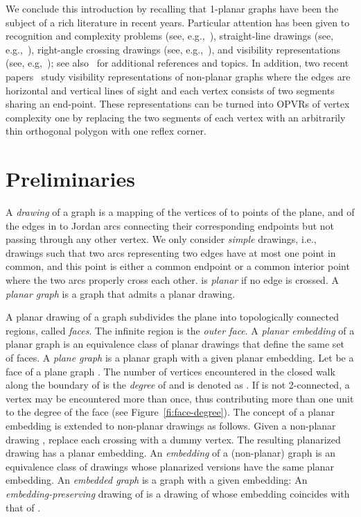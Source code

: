 \documentclass{article}
\newcommand{\opvr}{OPVR\xspace}
\begin{document}
We conclude this introduction by recalling that 1-planar graphs have been the subject of a rich literature in recent years. Particular attention has been given to   recognition and complexity problems (see, e.g.,~\cite{DBLP:conf/wads/BannisterCE13,DBLP:journals/siamcomp/CabelloM13,DBLP:journals/tcs/EadesHKLSS13,DBLP:journals/jgt/KorzhikM13}), straight-line drawings (see, e.g.,~\cite{DBLP:conf/gd/AlamBK13,t-rdg-JGT88}), right-angle crossing drawings (see, e.g.,~\cite{DBLP:conf/gd/DidimoL0M16,DBLP:journals/dam/EadesL13}), and visibility representations (see, e.g,~\cite{SoCG,DBLP:journals/jgaa/Brandenburg14,DBLP:journals/jgaa/Evans0LMW14}); see also~\cite{DBLP:journals/corr/KobourovLM17} for additional references and topics. In addition, two recent papers~\cite{DBLP:journals/tcs/EvansLM16,DBLP:journals/ipl/LiottaM16} study visibility representations of non-planar graphs where the edges are horizontal and vertical lines of sight and each vertex consists of two segments sharing an end-point. These representations can be turned into {\opvr}s of vertex complexity one by replacing the two segments of each vertex with an arbitrarily thin orthogonal polygon with one reflex corner. 



\section{Preliminaries}\label{se:preliminaries}

A \emph{drawing}  of a graph  is a mapping of the vertices of  to points of the plane, and of the edges in  to Jordan arcs connecting their corresponding endpoints but not passing through any other vertex. We only consider \emph{simple} drawings, i.e., drawings such that two arcs representing two edges have at most one point in common, and this point is either a common endpoint or a common interior point where the two arcs properly cross each other.  is \emph{planar} if no edge is crossed. A \emph{planar graph} is a graph that admits a planar drawing.

A planar drawing of a graph subdivides the plane into topologically connected regions, called \emph{faces}. The infinite region is the \emph{outer face}. A \emph{planar embedding} of a planar graph is an equivalence class of planar drawings that define the same set of faces. A \emph{plane graph} is a planar graph with a given planar embedding. Let  be a face of a plane graph . The number of vertices encountered in the closed walk along the boundary of  is the \emph{degree} of  and is denoted as . If  is not 2-connected, a vertex may be encountered more than once, thus contributing  more than one unit to the degree of the face (see Figure~\ref{fi:face-degree}).  
The concept of a planar embedding is extended to non-planar drawings as follows. Given a non-planar drawing , replace each crossing with a dummy vertex. The resulting planarized drawing has a planar embedding. An \emph{embedding} of a (non-planar) graph  is an equivalence class of  drawings whose planarized versions have the same planar embedding.
An \emph{embedded graph}  is a graph with a given embedding: An \emph{embedding-preserving} drawing  of  is a drawing of  whose embedding coincides with that of .
\end{document}

